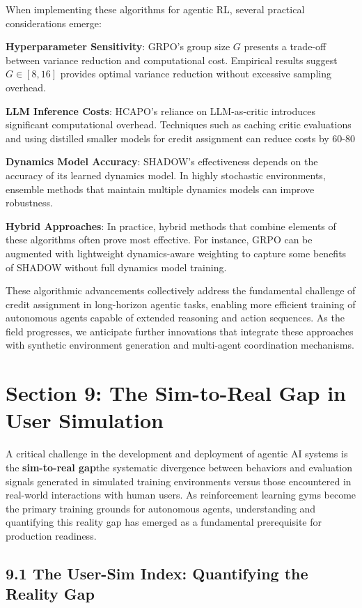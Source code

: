 When implementing these algorithms for agentic RL, several practical considerations emerge:

\textbf{Hyperparameter Sensitivity}: GRPO's group size $G$ presents a trade-off between variance reduction and computational cost. Empirical results suggest $G \in [8, 16]$ provides optimal variance reduction without excessive sampling overhead.

\textbf{LLM Inference Costs}: HCAPO's reliance on LLM-as-critic introduces significant computational overhead. Techniques such as caching critic evaluations and using distilled smaller models for credit assignment can reduce costs by 60-80%

\textbf{Dynamics Model Accuracy}: SHADOW's effectiveness depends on the accuracy of its learned dynamics model. In highly stochastic environments, ensemble methods that maintain multiple dynamics models can improve robustness.

\textbf{Hybrid Approaches}: In practice, hybrid methods that combine elements of these algorithms often prove most effective. For instance, GRPO can be augmented with lightweight dynamics-aware weighting to capture some benefits of SHADOW without full dynamics model training.

These algorithmic advancements collectively address the fundamental challenge of credit assignment in long-horizon agentic tasks, enabling more efficient training of autonomous agents capable of extended reasoning and action sequences. As the field progresses, we anticipate further innovations that integrate these approaches with synthetic environment generation and multi-agent coordination mechanisms.
\section{Section 9: The Sim-to-Real Gap in User Simulation}

A critical challenge in the development and deployment of agentic AI systems is the \textbf{sim-to-real gap}the systematic divergence between behaviors and evaluation signals generated in simulated training environments versus those encountered in real-world interactions with human users. As reinforcement learning gyms become the primary training grounds for autonomous agents, understanding and quantifying this reality gap has emerged as a fundamental prerequisite for production readiness.

\subsection{9.1 The User-Sim Index: Quantifying the Reality Gap}

